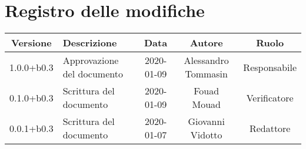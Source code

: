 \section*{Registro delle modifiche}

\begin{center}
	\begin{longtable}{|c|p{3cm}|c|c|c|}
	\hline
	\rowcolor{lighter-grayer}
	\textbf{Versione} & \textbf{Descrizione} & \textbf{Data} & \textbf{Autore} & \textbf{Ruolo} \\
	\hline
	\endfirsthead


	1.0.0+b0.3 & Approvazione del documento & 2020-01-09 & Alessandro Tommasin & Responsabile \\
	\hline
	0.1.0+b0.3 & Scrittura del documento & 2020-01-09 & Fouad Mouad & Verificatore \\
	\hline
	0.0.1+b0.3 & Scrittura del documento & 2020-01-07 & Giovanni Vidotto & Redattore \\
	\hline

	\end{longtable}
\end{center}